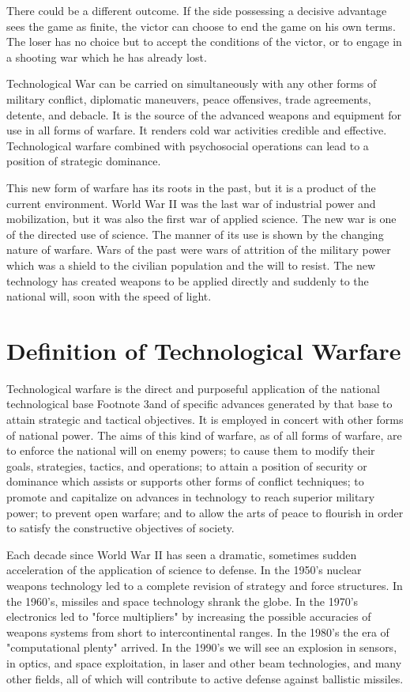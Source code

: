 \documentclass[a4paper,12pt]{book}
\begin{document}
There could be a different outcome. If the side possessing a decisive advantage sees the game as finite, the victor can choose to end the game on his own terms. The loser has no choice but to accept the conditions of the victor, or to engage in a shooting war which he has already lost.

Technological War can be carried on simultaneously with any other forms of military conflict, diplomatic maneuvers, peace offensives, trade agreements, detente, and debacle. It is the source of the advanced weapons and equipment for use in all forms of warfare. It renders cold war activities credible and effective. Technological warfare combined with psychosocial operations can lead to a position of strategic dominance.

This new form of warfare has its roots in the past, but it is a product of the current environment. World War II was the last war of industrial power and mobilization, but it was also the first war of applied science. The new war is one of the directed use of science. The manner of its use is shown by the changing nature of warfare. Wars of the past were wars of attrition of the military power which was a shield to the civilian population and the will to resist. The new technology has created weapons to be applied directly and suddenly to the national will, soon with the speed of light.

\section{Definition of Technological Warfare}
    
Technological warfare is the direct and purposeful application of the national technological base Footnote 3and of specific advances generated by that base to attain strategic and tactical objectives. It is employed in concert with other forms of national power. The aims of this kind of warfare, as of all forms of warfare, are to enforce the national will on enemy powers; to cause them to modify their goals, strategies, tactics, and operations; to attain a position of security or dominance which assists or supports other forms of conflict techniques; to promote and capitalize on advances in technology to reach superior military power; to prevent open warfare; and to allow the arts of peace to flourish in order to satisfy the constructive objectives of society.

Each decade since World War II has seen a dramatic, sometimes sudden acceleration of the application of science to defense. In the 1950's nuclear weapons technology led to a complete revision of strategy and force structures. In the 1960's, missiles and space technology shrank the globe. In the 1970's electronics led to "force multipliers" by increasing the possible accuracies of weapons systems from short to intercontinental ranges. In the 1980's the era of "computational plenty" arrived. In the 1990's we will see an explosion in sensors, in optics, and space exploitation, in laser and other beam technologies, and many other fields, all of which will contribute to active defense against ballistic missiles.
\end{document}
